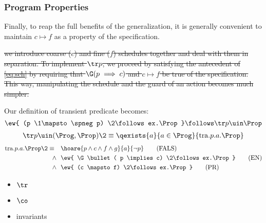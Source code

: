 \subsubsection{Program Properties}
Finally, to reap the full benefits of the generalization, it is generally convenient to maintain $c \mapsto f$ as a property of the specification.

\sout{we introduce coarse ($c$) and fine ($f$) schedules together and deal with them in separation. To implement $\tr p$, we proceed by satisfying the antecedent of \eqref{eq:sch} by requiring that $\G (p \implies c)$ and $c \mapsto f$ be true of the specification. This way, manipulating the schedule and the guard of an action becomes much simpler.}


Our definition of transient predicate becomes:
\[ \ew{ (p \1\mapsto \spneg p) \2\follows ex.\Prop} \follows \tr p \uin \Prop \]
\begin{align*}
 \tr p \uin (\Prog, \Prop)  \2\equiv \qexists{a}{ a \in \Prog }{ \text{tra}.p.a.\Prop }
\end{align*}
\begin{align*}
	\text{tra}.p.a.\Prop \2\equiv 
	\quad	& \hoare{ p \land c \land f \land g }{ a }{ \neg p } \tag{FALS} \\
	\land ~~	& \ew{ \G \bullet( p \implies c) \2\follows ex.\Prop} \tag{EN} \\
	\land ~~ 	& \ew{ (c \mapsto f) \2\follows ex.\Prop } \tag{PR}
\end{align*}

\begin{itemize}
\item $\tr$
\item $\co$
\item invariants
\end{itemize}


